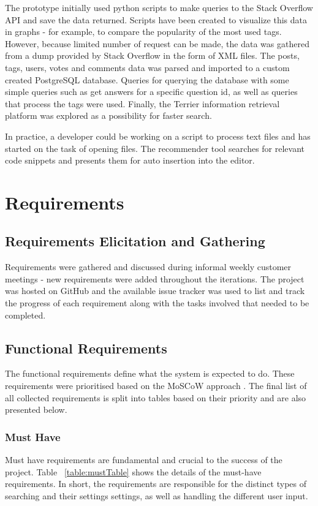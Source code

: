 \documentclass{l4proj}
\begin{document}
\noindent
The prototype initially used python scripts to make queries to the Stack Overflow API and save the data returned. Scripts have been created to visualize this data in graphs - for example, to compare the popularity of the most used tags. However, because limited number of request can be made, the data was gathered from a dump provided by Stack Overflow in the form of XML files. The posts, tags, users, votes and comments data was parsed and imported to a custom created PostgreSQL database. Queries for querying the database with some simple queries such as get answers for a specific question id, as well as queries that process the tags were used. Finally, the Terrier information retrieval platform was explored as a possibility for faster search.

\noindent
In practice, a developer could be working on a script to process text files and has started on the task of opening files. The recommender tool searches for relevant code snippets and presents them for auto insertion into the editor. 

\chapter{Requirements}

\section{Requirements Elicitation and Gathering}
Requirements were gathered and discussed during informal weekly customer meetings - new requirements were added throughout the iterations. The project was hosted on GitHub \cite{github} and the available issue tracker \cite{github-issues} was used to list and track the progress of each requirement along with the tasks involved that needed to be completed.

\section{Functional Requirements}
The functional requirements define what the system is expected to do. These requirements  were prioritised based on the MoSCoW approach \cite{moscow}. The final list of all collected requirements is split into tables based on their priority and are also presented below.

\subsection{Must Have}
Must have requirements are fundamental and crucial to the success of the project. Table ~\ref{table:mustTable} shows the details of the must-have requirements. In short, the requirements are responsible for the distinct types of searching and their settings settings, as well as handling the different user input.
\end{document}
